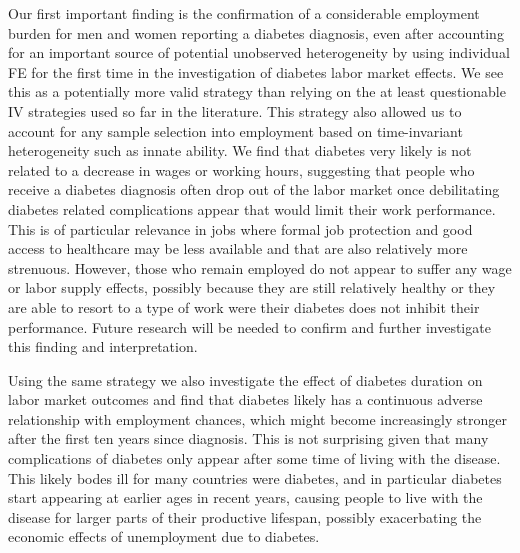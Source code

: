 \documentclass[12pt,english,british]{article}
\begin{document}
Our first important finding is the confirmation of a considerable employment burden for men and women reporting a diabetes diagnosis, even after accounting for an important source of potential unobserved heterogeneity by using individual \ac{FE} for the first time in the investigation of diabetes labor market effects. We see this as a potentially more valid strategy than relying on the at least questionable \ac{IV} strategies used so far in the literature. This strategy also allowed us to account for any sample selection into employment based on time-invariant heterogeneity such as innate ability. We find that diabetes very likely is not related to a decrease in wages or working hours, suggesting that people who receive a diabetes diagnosis often drop out of the labor market once debilitating diabetes related complications appear that would limit their work performance. This is of particular relevance in jobs where formal job protection and good access to healthcare may be less available and that are also relatively more strenuous. However, those who remain employed do not appear to suffer any wage or labor supply effects, possibly because they are still relatively healthy or they are able to resort to a type of work were their diabetes does not inhibit their performance. Future research will be needed to confirm and further investigate this finding and interpretation.

Using the same strategy we also investigate the effect of diabetes duration on labor market outcomes and find that diabetes likely has a continuous adverse relationship with employment chances, which might become increasingly stronger after the first ten years since diagnosis. This is not surprising given that many complications of diabetes only appear after some time of living with the disease. This likely bodes ill for many countries were diabetes, and in particular diabetes start appearing at earlier ages in recent years, causing people to live with the disease for larger parts of their productive lifespan, possibly exacerbating the economic effects of unemployment due to diabetes. 
\end{document}
